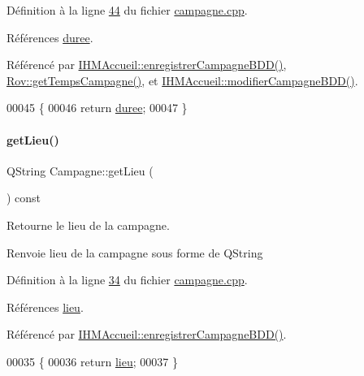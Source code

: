 Définition à la ligne \hyperlink{campagne_8cpp_source_l00044}{44} du fichier \hyperlink{campagne_8cpp_source}{campagne.\+cpp}.



Références \hyperlink{campagne_8h_source_l00044}{duree}.



Référencé par \hyperlink{ihmaccueil_8cpp_source_l00273}{I\+H\+M\+Accueil\+::enregistrer\+Campagne\+B\+D\+D()}, \hyperlink{rov_8cpp_source_l00154}{Rov\+::get\+Temps\+Campagne()}, et \hyperlink{ihmaccueil_8cpp_source_l00295}{I\+H\+M\+Accueil\+::modifier\+Campagne\+B\+D\+D()}.


\begin{DoxyCode}
00045 \{
00046     \textcolor{keywordflow}{return} \hyperlink{class_campagne_a4fb4cb286275103c9b6946e25e301fbf}{duree};
00047 \}
\end{DoxyCode}
\mbox{\label{class_campagne_a98d71a731d16dec7a882787387b29d8e}} 
\paragraph{\texorpdfstring{get\+Lieu()}{getLieu()}}
{\footnotesize\ttfamily Q\+String Campagne\+::get\+Lieu (\begin{DoxyParamCaption}{ }\end{DoxyParamCaption}) const}



Retourne le lieu de la campagne. 

\begin{DoxyReturn}{Renvoie}
lieu de la campagne sous forme de Q\+String 
\end{DoxyReturn}


Définition à la ligne \hyperlink{campagne_8cpp_source_l00034}{34} du fichier \hyperlink{campagne_8cpp_source}{campagne.\+cpp}.



Références \hyperlink{campagne_8h_source_l00041}{lieu}.



Référencé par \hyperlink{ihmaccueil_8cpp_source_l00273}{I\+H\+M\+Accueil\+::enregistrer\+Campagne\+B\+D\+D()}.


\begin{DoxyCode}
00035 \{
00036     \textcolor{keywordflow}{return} \hyperlink{class_campagne_a1df66832d5d700bfd2bd36fe548f7cba}{lieu};
00037 \}
\end{DoxyCode}
\mbox{\label{class_campagne_ab3a3e6e325fec3aef0521f077e71c914}} 
